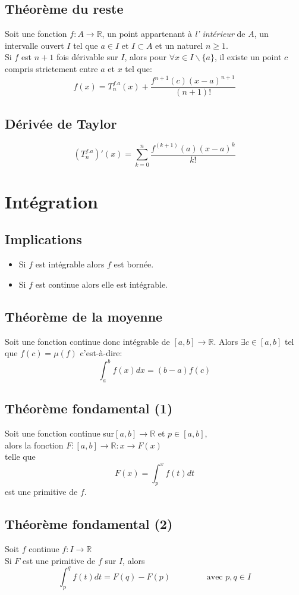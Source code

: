 \subsection{Théorème du reste}
Soit une fonction $f : A \rightarrow \mathbb{R}$, un point appartenant à \emph{l' intérieur} de $A$, un intervalle ouvert $I$ tel que $a \in I$ et $I\subset A$ et un naturel $n \geq 1$.\\
Si $f$ est $n + 1$ fois dérivable sur $I$, alors pour $\forall x \in I \backslash \{a\}$, il existe un point $c$ compris strictement entre $a$ et $x$ tel que:
\[f(x) = T_n^{f.a}(x) + \frac{f^{n+1}(c)(x - a)^{n+1}}{(n + 1)!}\]
\subsection{Dérivée de Taylor}
\[\left(T_n^{f.a}\right)'(x) = \sum_{k = 0}^n \frac{f^{(k+1)}(a)(x - a)^{k}}{k!}\]

\section{Intégration}
\subsection{Implications}
\begin{itemize}
\item Si $f$ est intégrable alors $f$ est bornée.
\item Si $f$ est continue alors elle est intégrable.
\end{itemize}

\subsection{Théorème de la moyenne}
Soit une fonction continue donc intégrable de $[a,b] \rightarrow \mathbb{R}$.
Alors $\exists c \in [a,b]$ tel que $f(c) = \mu{(f)}$ c'est-à-dire:
\[\int_a^b f(x) dx = (b - a)f(c)\]
\subsection{Théorème fondamental (1)}
Soit une fonction continue sur$[a,b] \rightarrow \mathbb{R}$ et $p \in [a,b]$,\\
alors la fonction $F : [a,b] \rightarrow \mathbb{R} : x \rightarrow F(x)$\\
telle que
\[F(x) = \int_p^x f(t) dt\]
est une primitive de $f$.

\subsection{Théorème fondamental (2)}
Soit $f$ continue $f : I \rightarrow \mathbb{R}$\\
Si $F$ est une primitive de $f$ sur $I$, alors
\[\int_p^q f(t) dt = F(q) - F(p) \qquad{\qquad}\text{ avec } p,q \in I\]

